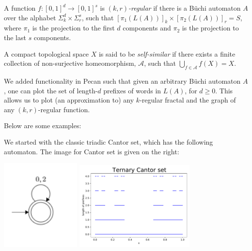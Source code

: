 \documentclass[10pt,usenames,dvipsnames]{article}
\begin{document}
\begin{definition}
A function $f: [0, 1]^d \to [0, 1]^s$ is \emph{$(k, r)$-regular} if there is a B\"uchi automaton $A$
over the alphabet $\Sigma^d_k \times \Sigma^s_r$, such that $[\pi_1(L(A))]_k \times [\pi_2(L(A))]_r = S$,
where $\pi_1$ is the projection to the first $d$ components and $\pi_2$ is the projection to the
last $s$ components. 
\end{definition}

\begin{definition}
A compact topological space $X$ is said to be \emph{self-similar} if there exists a finite collection of non-surjective homeomorphism, $\mathcal{A}$, such that $\bigcup_{f\in\mathcal{A}}f(X) = X$.
\end{definition}

We added functionality in Pecan such that given an arbitrary B\"uchi automaton $A$,
one can plot the set of length-$d$ prefixes of words in $L(A)$, for $d \ge 0$.
This allows us to plot (an approximation to) any $k$-regular fractal and
the graph of any $(k, r)$-regular function.

Below are some examples:

We started with the classic triadic Cantor set, which has the following automaton. The image for Cantor set is given on the right:

\begin{center}
    \includegraphics[width=4cm]{FA20/images/fractals/cantor-automata.png}
    \includegraphics[width=6cm]{FA20/images/fractals/cantor3.pdf}
\end{center}
\end{document}
